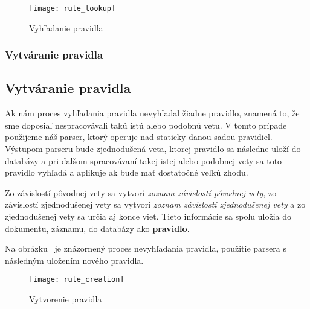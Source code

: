 \begin{figure}[H]
	\begin{center}\texttt{[image: rule\_lookup]}\end{center}
	\caption[Vyhľadanie pravidla]{Vyhľadanie pravidla}\label{fig:rule_lookup}
\end{figure}

%
%
{
	\subsubsection{Vytváranie pravidla}
}
{
	\subsection{Vytváranie pravidla}
}
\label{subsubsection:rule_creation}
Ak nám proces vyhľadania pravidla nevyhľadal žiadne pravidlo, znamená to, že sme doposiaľ nespracovávali takú istú alebo podobnú vetu. V tomto prípade použijeme náš parser, ktorý operuje nad staticky danou sadou pravidiel. Výstupom parseru bude zjednodušená veta, ktorej pravidlo sa následne uloží do databázy a pri ďalšom spracovávaní takej istej alebo podobnej vety sa toto pravidlo vyhľadá a aplikuje ak bude mať dostatočné veľkú zhodu.

Zo závislostí pôvodnej vety sa vytvorí \textit{zoznam závislostí pôvodnej vety}, zo závislostí zjednodušenej vety sa vytvorí \textit{zoznam závislostí zjednodušenej vety} a zo zjednodušenej vety sa určia aj konce viet. Tieto informácie sa spolu uložia do dokumentu, záznamu, do databázy ako \textbf{pravidlo}.

Na obrázku~ je znázornený proces nevyhľadania pravidla, použitie parsera s následným uložením nového pravidla.

\begin{figure}[H]
	\begin{center}\texttt{[image: rule\_creation]}\end{center}
	\caption[Vytvorenie pravidla]{Vytvorenie pravidla}\label{fig:rule_creation}
\end{figure}

